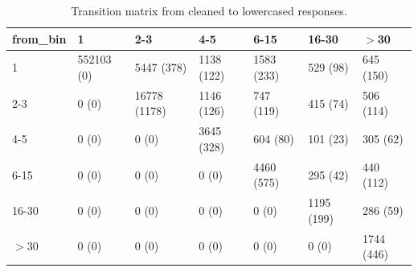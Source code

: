 \begin{table}[H]
\centering
\caption{Transition matrix from cleaned to lowercased responses.} 
\label{tab:tab-0-1}
\begin{tabular}{lllllll}
  \hline
from\_bin & 1 & 2-3 & 4-5 & 6-15 & 16-30 & $>$30 \\ 
  \hline
1 & 552103 (0) & 5447 (378) & 1138 (122) & 1583 (233) & 529 (98) & 645 (150) \\ 
  2-3 & 0 (0) & 16778 (1178) & 1146 (126) & 747 (119) & 415 (74) & 506 (114) \\ 
  4-5 & 0 (0) & 0 (0) & 3645 (328) & 604 (80) & 101 (23) & 305 (62) \\ 
  6-15 & 0 (0) & 0 (0) & 0 (0) & 4460 (575) & 295 (42) & 440 (112) \\ 
  16-30 & 0 (0) & 0 (0) & 0 (0) & 0 (0) & 1195 (199) & 286 (59) \\ 
  $>$30 & 0 (0) & 0 (0) & 0 (0) & 0 (0) & 0 (0) & 1744 (446) \\ 
   \hline
\end{tabular}
\end{table}
